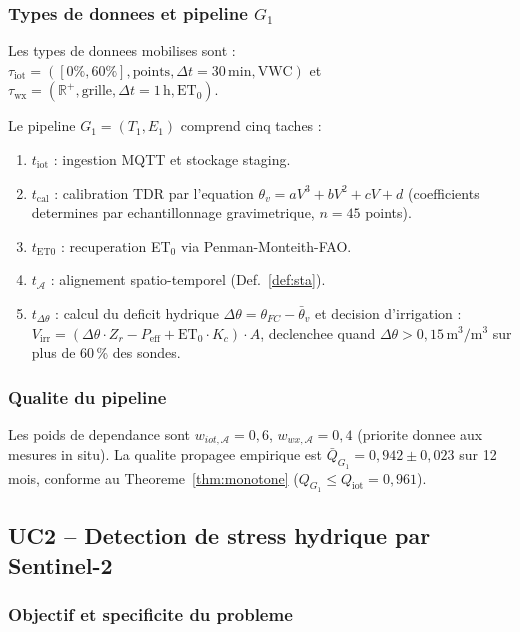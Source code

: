 \documentclass[12pt,a4paper]{article}
\theoremstyle{plain}
\theoremstyle{definition}
\theoremstyle{remark}
\newcommand{\R}{\mathbb{R}}
\begin{document}
	\subsubsection{Types de donnees et pipeline $G_1$}
	
	Les types de donnees mobilises sont :
	$\tau_{\text{iot}} = ([0\%,60\%], \text{points}, \Delta t=30\,\text{min}, \text{VWC})$
	et
	$\tau_{\text{wx}} = (\R^+, \text{grille}, \Delta t=1\,\text{h}, \text{ET}_0)$.
	
	Le pipeline $G_1 = (T_1, E_1)$ comprend cinq taches :
	
	\begin{enumerate}[leftmargin=1.5em,noitemsep]
		\item $t_{\text{iot}}$ : ingestion MQTT et stockage staging.
		\item $t_{\text{cal}}$ : calibration TDR par l'equation
		$\theta_v = aV^3 + bV^2 + cV + d$ (coefficients determines par
		echantillonnage gravimetrique, $n=45$ points).
		\item $t_{\text{ET0}}$ : recuperation ET$_0$ via Penman-Monteith-FAO.
		\item $t_{\mathcal{A}}$ : alignement spatio-temporel (Def.~\ref{def:sta}).
		\item $t_{\Delta\theta}$ : calcul du deficit hydrique
		$\Delta\theta = \theta_{FC} - \bar\theta_v$ et decision
		d'irrigation :
		$V_{\text{irr}} = (\Delta\theta \cdot Z_r - P_{\text{eff}} +
		\text{ET}_0 \cdot K_c) \cdot A$,
		declenchee quand $\Delta\theta > 0{,}15\,\text{m}^3/\text{m}^3$
		sur plus de 60\,\% des sondes.
	\end{enumerate}
	
	\subsubsection{Qualite du pipeline}
	
	Les poids de dependance sont $w_{iot,\mathcal{A}}=0{,}6$,
	$w_{wx,\mathcal{A}}=0{,}4$ (priorite donnee aux mesures in situ).
	La qualite propagee empirique est
	$\bar Q_{G_1} = 0{,}942 \pm 0{,}023$ sur 12 mois, conforme au
	Theoreme~\ref{thm:monotone} ($Q_{G_1} \leq Q_{\text{iot}} = 0{,}961$).
	
	\subsection{UC2 -- Detection de stress hydrique par Sentinel-2}
	\label{subsec:uc2}
	
	\subsubsection{Objectif et specificite du probleme}
	
\end{document}
